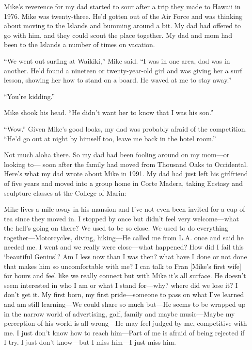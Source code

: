 \documentclass[12pt]{book}
\begin{document}
Mike's reverence for my dad started to sour after a trip they made to Hawaii in 1976. Mike was twenty-three. He'd gotten out of the Air Force and was thinking about moving to the Islands and bumming around a bit. My dad had offered to go with him, and they could scout the place together. My dad and mom had been to the Islands a number of times on vacation.

``We went out surfing at Waikiki,'' Mike said. ``I was in one area, dad was in another. He'd found a nineteen or twenty-year-old girl and was giving her a surf lesson, showing her how to stand on a board. He waved at me to stay away.''

``You're kidding.''

Mike shook his head. ``He didn't want her to know that I was his son.''

``Wow.'' Given Mike's good looks, my dad was probably afraid of the competition. ``He'd go out at night by himself too, leave me back in the hotel room.''

Not much aloha there. So my dad had been fooling around on my mom---or looking to--- soon after the family had moved from Thousand Oaks to Occidental. Here's what my dad wrote about Mike in 1991. My dad had just left his girlfriend of five years and moved into a group home in Corte Madera, taking Ecstasy and sculpture classes at the College of Marin:

Mike lives a mile away in his mansion and I've not even been invited for a cup of tea since they moved in. I stopped by once but didn't feel very welcome---what the hell's going on there? We used to be so close. We used to do everything together---Motorcycles, diving, hiking---He called me from L.A. once and said he needed me. I went and we really were close---what happened? How did I fail this `beautiful Genius'? Am I less now than I was then? what have I done or not done that makes him so uncomfortable with me? I can talk to Fran [Mike's first wife] for hours and feel like we really connect but with Mike it's all surface. He doesn't seem interested in who I am or what I stand for---why? where did we lose it? I don't get it. My first born, my first pride---someone to pass on what I've learned and am still learning---We could share so much but---He seems to be wrapped up in the narrow world of advertising, golf, family and maybe music---Maybe my perception of his world is all wrong---He may feel judged by me, competitive with me. I just don't know how to reach him---Part of me is afraid of being rejected if I try. I just don't know---but I miss him---I just miss him.
\end{document}
